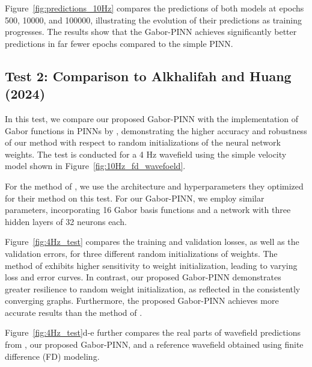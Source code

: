 \documentclass[authoryear, preprint, 12pt]{elsarticle}
\begin{document}
	Figure~\ref{fig:predictions_10Hz} compares the predictions of both models at epochs 500, 10000, and 100000, illustrating the evolution of their predictions as training progresses. The results show that the Gabor-PINN achieves significantly better predictions in far fewer epochs compared to the simple PINN.
	
	
	\subsection{Test 2: Comparison to Alkhalifah and Huang  (2024)}
	
	In this test, we compare our proposed Gabor-PINN with the implementation of Gabor functions in PINNs by \cite{Alkhalifah2024}, demonstrating the higher accuracy and robustness of our method with respect to random initializations of the neural network weights. The test is conducted for a 4 Hz wavefield using the simple velocity model shown in Figure~\ref{fig:10Hz_fd_wavefoeld}.
	
	For the method of \cite{Alkhalifah2024}, we use the architecture and hyperparameters they optimized for their method on this test. For our Gabor-PINN, we employ similar parameters, incorporating 16 Gabor basis functions and a network with three hidden layers of 32 neurons each. 
	
	Figure~\ref{fig:4Hz_test} compares the training and validation losses, as well as the validation errors, for three different random initializations of weights. The method of \cite{Alkhalifah2024} exhibits higher sensitivity to weight initialization, leading to varying loss and error curves. In contrast, our proposed Gabor-PINN demonstrates greater resilience to random weight initialization, as reflected in the consistently converging graphs. Furthermore, the proposed Gabor-PINN achieves more accurate results than the method of \cite{Alkhalifah2024}.
	
	Figure~\ref{fig:4Hz_test}d-e further compares the real parts of wavefield predictions from \cite{Alkhalifah2024}, our proposed Gabor-PINN, and a reference wavefield obtained using finite difference (FD) modeling.
	
\end{document}
